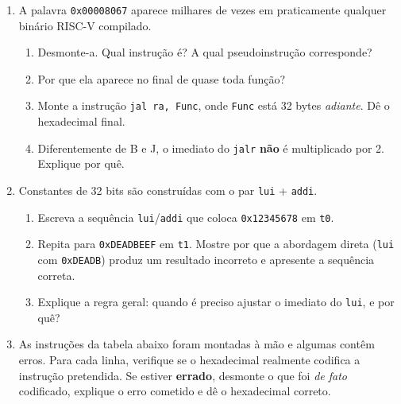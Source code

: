 \documentclass[11pt, a4paper]{article}
\begin{document}
\begin{enumerate}
\begin{curiosidade}
\emph{Bit flips} por radia\c{c}\~{a}o s\~{a}o um problema real em sat\'{e}lites e at\'{e} em servidores na superf\'{i}cie. Por isso, mem\'{o}rias de sistemas cr\'{i}ticos usam c\'{o}digos de corre\c{c}\~{a}o de erros (ECC), e decodificadores de instru\c{c}\~{a}o detectam \emph{opcodes} inv\'{a}lidos e disparam uma exce\c{c}\~{a}o.
\end{curiosidade}

\item A palavra \texttt{0x00008067} aparece milhares de vezes em praticamente qualquer bin\'{a}rio RISC-V compilado.
\begin{enumerate}
  \item Desmonte-a. Qual instru\c{c}\~{a}o \'{e}? A qual pseudoinstru\c{c}\~{a}o corresponde?
  \item Por que ela aparece no final de quase toda fun\c{c}\~{a}o?
  \item Monte a instru\c{c}\~{a}o \texttt{jal ra, Func}, onde \texttt{Func} est\'{a} 32 bytes \emph{adiante}. D\^{e} o hexadecimal final.
  \item Diferentemente de B e J, o imediato do \texttt{jalr} \textbf{n\~{a}o} \'{e} multiplicado por 2. Explique por qu\^{e}.
\end{enumerate}

\item Constantes de 32 bits s\~{a}o constru\'{i}das com o par \texttt{lui} + \texttt{addi}.
\begin{enumerate}
  \item Escreva a sequ\^{e}ncia \texttt{lui}/\texttt{addi} que coloca \texttt{0x12345678} em \texttt{t0}.
  \item Repita para \texttt{0xDEADBEEF} em \texttt{t1}. Mostre por que a abordagem direta (\texttt{lui} com \texttt{0xDEADB}) produz um resultado incorreto e apresente a sequ\^{e}ncia correta.
  \item Explique a regra geral: quando \'{e} preciso ajustar o imediato do \texttt{lui}, e por qu\^{e}?
\end{enumerate}

\item As instru\c{c}\~{o}es da tabela abaixo foram montadas \`{a} m\~{a}o e algumas cont\^{e}m erros. Para cada linha, verifique se o hexadecimal realmente codifica a instru\c{c}\~{a}o pretendida. Se estiver \textbf{errado}, desmonte o que foi \emph{de fato} codificado, explique o erro cometido e d\^{e} o hexadecimal correto.


\end{enumerate}
\end{document}
